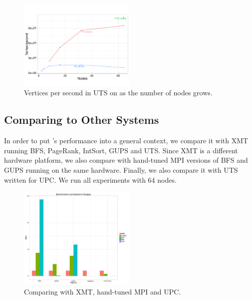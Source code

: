 \begin{figure}[ht]
    \begin{center}
      \includegraphics[width=0.5\textwidth]{figs/uts_scale.pdf}
    \end{center}
    \caption{Vertices per second in UTS on \Grappa as the number of nodes grows.}
    \label{fig:grappa-uts}
\end{figure}

\subsection{Comparing \Grappa to Other Systems}
\label{eval:mainperf}

In order to put \Grappa's performance into a general context, we compare it
with XMT running BFS, PageRank, IntSort, GUPS and UTS. Since XMT is a
different hardware platform, we also compare \Grappa with hand-tuned MPI
versions of BFS and GUPS running on the same hardware. Finally, we also
compare it with UTS written for UPC. We run all experiments with 64 nodes.

\begin{figure}[ht]
    \begin{center}
      \includegraphics[width=0.5\textwidth]{results/benchmarks.pdf}
    \end{center}
    \caption{Comparing \Grappa with XMT, hand-tuned MPI and UPC.}
    \label{fig:grappa-comparisons}
\end{figure}


